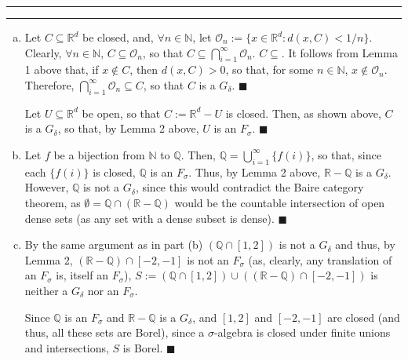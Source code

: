 \documentclass[11pt]{article}
\newcounter{questionCounter}
\newcounter{partCounter}[questionCounter]
\newenvironment{question}[2][\arabic{questionCounter}]{%
    \setcounter{partCounter}{0}%
    \vspace{.25in} \hrule \vspace{0.5em}%
        \noindent{\bf #2}%
    \vspace{0.8em} \hrule \vspace{.10in}%
    \addtocounter{questionCounter}{1}%
}{}
\renewcommand{\qed}{\quad $\blacksquare$}
\newcommand{\N}{\mathbb{N}} %
\newcommand{\Q}{\mathbb{Q}} %
\newcommand{\R}{\mathbb{R}} %
\renewcommand{\O}{\mathcal{O}}
\begin{document}
\begin{question}{Chapter 1, Problem 13}
\begin{enumerate}[(a)]
\item Let $C \subseteq \R^d$ be closed, and, $\forall n \in \N$, let
$\O_n := \{x \in \R^d : d(x,C) < 1/n\}$. Clearly, $\forall n \in \N$,
$C \subseteq \O_n$, so that $C \subseteq \bigcap_{i = 1}^{\infty} \O_n$.
$C \subseteq $. It follows from Lemma 1 above that, if $x \notin C$, then
$d(x,C) > 0$, so that, for some $n \in \N$, $x \notin \O_n$. Therefore,
$\bigcap_{i = 1}^{\infty} \O_n \subseteq C$, so that $C$ is a $G_{\delta}$.
\qed

Let $U \subseteq \R^d$ be open, so that $C := \R^d - U$ is closed. Then, as
shown above, $C$ is a $G_{\delta}$, so that, by Lemma 2 above, $U$ is an
$F_{\sigma}$. \qed

\item Let $f$ be a bijection from $\N$ to $\Q$. Then,
$\Q = \bigcup_{i = 1}^{\infty} \{f(i)\}$, so that, since each $\{f(i)\}$ is
closed, $\Q$ is an $F_{\sigma}$. Thus, by Lemma 2 above, $\R - \Q$ is a
$G_{\delta}$. However, $\Q$ is not a $G_{\delta}$, since this would contradict
the Baire category theorem, as $\emptyset = \Q \cap (\R - \Q)$ would be the
countable intersection of open dense sets (as any set with a dense subset is
dense). \qed

\item By the same argument as in part (b) $(\Q \cap [1,2])$ is not a
$G_{\delta}$ and thus, by Lemma 2, $(\R - \Q) \cap [-2,-1]$ is not
an $F_{\sigma}$ (as, clearly, any translation of an $F_{\sigma}$ is, itself an
$F_{\sigma}$), $S := (\Q \cap [1,2]) \cup ((\R - \Q) \cap [-2,-1])$ is neither a
$G_{\delta}$ nor an $F_{\sigma}$.

Since $\Q$ is an $F_{\sigma}$ and $\R - \Q$ is a $G_{\delta}$, and
$[1,2]$ and $[-2,-1]$ are closed (and thus, all these sets are Borel),
since a $\sigma$-algebra is closed under finite unions and intersections,
$S$ is Borel. \qed
\end{enumerate}
\end{question}
\end{document}
